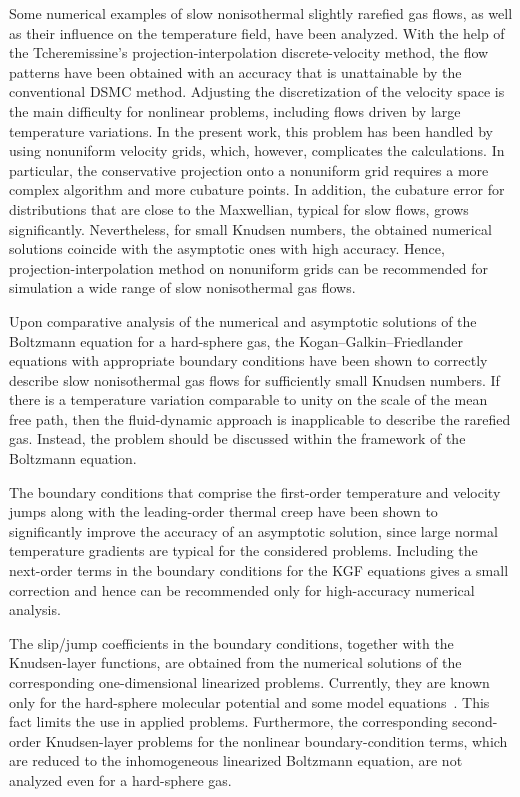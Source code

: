 \documentclass[10pt]{article}
\begin{document}
Some numerical examples of slow nonisothermal slightly rarefied gas flows,
as well as their influence on the temperature field, have been analyzed.
With the help of the Tcheremissine's projection-interpolation discrete-velocity method,
the flow patterns have been obtained with an accuracy that is unattainable by the conventional DSMC method.
Adjusting the discretization of the velocity space is the main difficulty for nonlinear problems,
including flows driven by large temperature variations.
In the present work, this problem has been handled by using nonuniform velocity grids,
which, however, complicates the calculations.
In particular, the conservative projection onto a nonuniform grid requires
a more complex algorithm and more cubature points.
In addition, the cubature error for distributions that are close to the Maxwellian, typical for slow flows, grows significantly.
Nevertheless, for small Knudsen numbers, the obtained numerical solutions coincide with the asymptotic ones with high accuracy.
Hence, projection-interpolation method on nonuniform grids can be recommended
for simulation a wide range of slow nonisothermal gas flows.

Upon comparative analysis of the numerical and asymptotic solutions of the Boltzmann equation for a hard-sphere gas,
the Kogan--Galkin--Friedlander equations with appropriate boundary conditions have been shown to correctly describe
slow nonisothermal gas flows for sufficiently small Knudsen numbers.
If there is a temperature variation comparable to unity on the scale of the mean free path,
then the fluid-dynamic approach is inapplicable to describe the rarefied gas.
Instead, the problem should be discussed within the framework of the Boltzmann equation.

The boundary conditions that comprise the first-order temperature and velocity jumps along with the leading-order thermal creep
have been shown to significantly improve the accuracy of an asymptotic solution,
since large normal temperature gradients are typical for the considered problems.
Including the next-order terms in the boundary conditions for the KGF equations gives a small correction
and hence can be recommended only for high-accuracy numerical analysis.

The slip/jump coefficients in the boundary conditions, together with the Knudsen-layer functions,
are obtained from the numerical solutions of the corresponding one-dimensional linearized problems.
Currently, they are known only for the hard-sphere molecular potential and some model equations~\cite{Takata2016}.
This fact limits the use in applied problems.
Furthermore, the corresponding second-order Knudsen-layer problems for the nonlinear boundary-condition terms,
which are reduced to the inhomogeneous linearized Boltzmann equation,
are not analyzed even for a hard-sphere gas.
\end{document}
